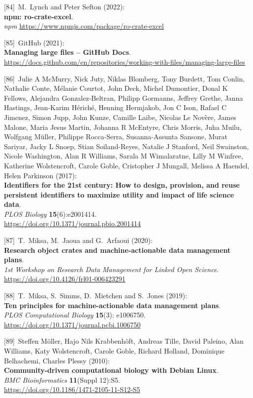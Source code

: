 {[}84{]}~M.~Lynch and Peter Sefton (2022):\\
\textbf{npm: ro-crate-excel}.\\
\emph{npm} \url{https://www.npmjs.com/package/ro-crate-excel}

{[}85{]}~GitHub (2021):\\
\textbf{Managing large files -- GitHub Docs}.\\
\url{https://docs.github.com/en/repositories/working-with-files/managing-large-files}

{[}86{]}~Julie A McMurry, Nick Juty, Niklas Blomberg, Tony Burdett, Tom
Conlin, Nathalie Conte, Mélanie Courtot, John Deck, Michel Dumontier,
Donal K Fellows, Alejandra Gonzalez-Beltran, Philipp Gormanns, Jeffrey
Grethe, Janna Hastings, Jean-Karim Hériché, Henning Hermjakob, Jon C
Ison, Rafael C Jimenez, Simon Jupp, John Kunze, Camille Laibe, Nicolas
Le Novère, James Malone, Maria Jesus Martin, Johanna R McEntyre, Chris
Morris, Juha Muilu, Wolfgang Müller, Philippe Rocca-Serra,
Susanna-Assunta Sansone, Murat Sariyar, Jacky L Snoep, Stian
Soiland-Reyes, Natalie J Stanford, Neil Swainston, Nicole Washington,
Alan R Williams, Sarala M Wimalaratne, Lilly M Winfree, Katherine
Wolstencroft, Carole Goble, Cristopher J Mungall, Melissa A Haendel,
Helen Parkinson (2017):\\
\textbf{Identifiers for the 21st century: How to design, provision, and
reuse persistent identifiers to maximize utility and impact of life
science data}.\\
\emph{PLOS Biology} \textbf{15}(6):e2001414.\\
\url{https://doi.org/10.1371/journal.pbio.2001414}

{[}87{]}~T.~Miksa, M.~Jaoua and G.~Arfaoui (2020):\\
\textbf{Research object crates and machine-actionable data management
plans}.\\
\emph{1st Workshop on Research Data Management for Linked Open
Science}.\\
\url{https://doi.org/10.4126/frl01-006423291}

{[}88{]}~T.~Miksa, S.~Simms, D.~Mietchen and S.~Jones (2019):\\
\textbf{Ten principles for machine-actionable data management plans}.\\
\emph{PLOS Computational Biology} \textbf{15}(3): e1006750.\\
\url{https://doi.org/10.1371/journal.pcbi.1006750}

{[}89{]}~Steffen Möller, Hajo Nils Krabbenhöft, Andreas Tille, David
Paleino, Alan Williams, Katy Wolstencroft, Carole Goble, Richard
Holland, Dominique Belhachemi, Charles Plessy (2010):\\
\textbf{Community-driven computational biology with Debian Linux}.\\
\emph{BMC Bioinformatics} \textbf{11}(Suppl 12):S5.\\
\url{https://doi.org/10.1186/1471-2105-11-S12-S5}

